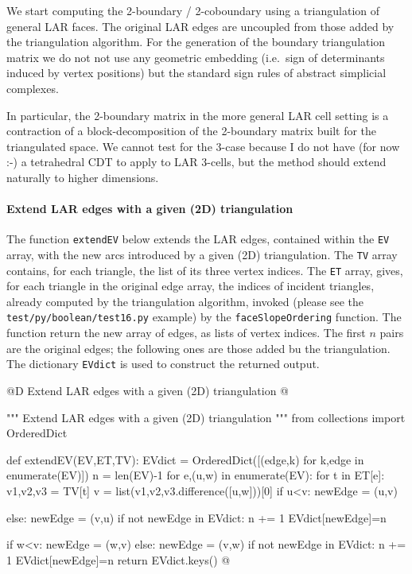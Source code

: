 \documentclass[11pt,oneside]{article}    %
\begin{document}
We start computing the 2-boundary / 2-coboundary using a triangulation of general LAR faces.  The original LAR edges are uncoupled from those added by the triangulation algorithm. 
For the  generation of the boundary triangulation matrix we do not not use any geometric embedding (i.e.~sign of determinants induced by vertex positions) but the standard sign rules of abstract simplicial complexes.

In particular, the 2-boundary matrix in the more general LAR cell setting is a contraction of a block-decomposition of the 2-boundary matrix built for the triangulated space.  We cannot test for the 3-case because I do not have (for now :-) a tetrahedral CDT to apply to LAR 3-cells, but the method should extend naturally to higher dimensions.

\paragraph{Extend LAR edges with a given (2D) triangulation}

The function \texttt{extendEV} below extends the LAR edges, contained within the \texttt{EV} array, with the new arcs introduced by a given (2D) triangulation. The \texttt{TV} array contains, for each triangle, the list of its three vertex indices. The \texttt{ET} array, gives, for each triangle in the original edge array, the indices of incident triangles, already computed by the triangulation algorithm, invoked (please see the \texttt{test/py/boolean/test16.py} example) by the \texttt{faceSlopeOrdering} function.
The function return the new array of edges, as lists of vertex indices. The first $n$ pairs are the original edges; the following ones are those added bu the triangulation. The dictionary \texttt{EVdict} is used to construct the returned output.

@D Extend LAR edges with a given (2D) triangulation
@{""" Extend LAR edges with a given (2D) triangulation """
from collections import OrderedDict

def extendEV(EV,ET,TV):
    EVdict = OrderedDict([(edge,k) for k,edge in enumerate(EV)])
    n = len(EV)-1
    for e,(u,w) in enumerate(EV):
        for t in ET[e]:
            v1,v2,v3 = TV[t]
            v = list({v1,v2,v3}.difference([u,w]))[0]
            if u<v: newEdge = (u,v)
            
            else: newEdge = (v,u)
            if not newEdge in EVdict: 
                n += 1
                EVdict[newEdge]=n
                
            if w<v: newEdge = (w,v)
            else: newEdge = (v,w)
            if not newEdge in EVdict: 
                n += 1
                EVdict[newEdge]=n
    return EVdict.keys()
@}
\end{document}
